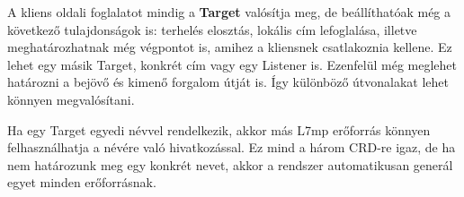 A kliens oldali foglalatot mindig a \textbf{Target} valósítja meg, de beállíthatóak még a 
következő tulajdonságok is: terhelés elosztás, lokális cím lefoglalása, illetve 
meghatározhatnak még végpontot is, amihez a kliensnek csatlakoznia kellene. Ez 
lehet egy másik Target, konkrét cím vagy egy Listener is. Ezenfelül még meglehet 
határozni a bejövő és kimenő forgalom útját is. Így különböző útvonalakat lehet 
könnyen megvalósítani. 

Ha egy Target egyedi névvel rendelkezik, akkor más L7mp erőforrás könnyen 
felhasználhatja a névére való hivatkozással. Ez mind a három CRD-re igaz, de ha
nem határozunk meg egy konkrét nevet, akkor a rendszer automatikusan generál 
egyet minden erőforrásnak. 

